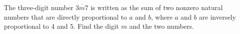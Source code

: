 The three-digit number $\overline{3m7}$ is written as the sum of two nonzero natural numbers that are directly proportional to $a$ and $b$, where $a$ and $b$ are inversely proportional to $4$ and $5$. Find the digit $m$ and the two numbers.
